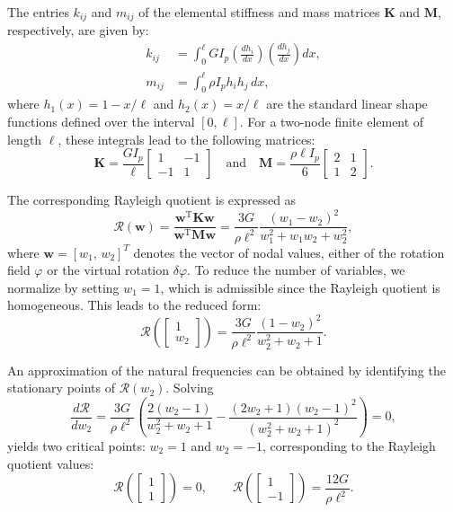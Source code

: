 \documentclass[12pt]{article}
\begin{document}
The entries \( k_{ij} \) and \( m_{ij} \) of the elemental stiffness and mass matrices \( \mathbf{K} \) and \( \mathbf{M} \), respectively, are given by:
\begin{align*}
    k_{ij} & = \int_0^{\ell} G I_p \left( \frac{d h_i}{dx} \right) \left( \frac{d h_j}{dx} \right) dx, \\
    m_{ij} & = \int_0^{\ell} \rho I_p h_i h_j \, dx,
\end{align*}
where \(  h_1(x)=1-x/\ell \) and \(  h_2(x)=x/\ell\) are the standard linear shape functions defined over the interval \([0, \ell]\). For a two-node finite element of length \( \ell \), these integrals lead to the following matrices:
\[
    \mathbf{K} = \frac{G I_p}{\ell}
    \begin{bmatrix}
        1  & -1 \\
        -1 & 1
    \end{bmatrix} \quad\text{and}\quad
    \mathbf{M} = \frac{\rho\ell I_p}{6}
    \begin{bmatrix}
        2 & 1 \\
        1 & 2
    \end{bmatrix}.
\]

The corresponding Rayleigh quotient is expressed as
\[
    \mathcal{R}(\mathbf{w}) = \frac{\mathbf{w}^\mathrm{T} \mathbf{K} \mathbf{w}}{\mathbf{w}^\mathrm{T} \mathbf{M} \mathbf{w}} = \frac{3G}{\rho\ell^2} \frac{(w_1 - w_2)^2}{w_1^2 + w_1 w_2 + w_2^2},
\]
where \( \mathbf{w} = [w_1,\, w_2]^T \) denotes the vector of nodal values, either of the rotation field \( \varphi \) or the virtual rotation \( \delta\varphi \). To reduce the number of variables, we normalize by setting \( w_1 = 1 \), which is admissible since the Rayleigh quotient is homogeneous. This leads to the reduced form:
\[
    \mathcal{R}\left( \begin{bmatrix} 1 \\ w_2 \end{bmatrix} \right) = \frac{3G}{\rho\ell^2} \frac{(1 - w_2)^2}{w_2^2 + w_2 + 1}.
\]

An approximation of the natural frequencies can be obtained by identifying the stationary points of \( \mathcal{R}(w_2) \). Solving
\[
    \frac{d \mathcal{R}}{dw_2} = \frac{3G}{\rho\ell^2} \left( \frac{2(w_2 - 1)}{w_2^2 + w_2 + 1} - \frac{(2w_2 + 1)(w_2 - 1)^2}{(w_2^2 + w_2 + 1)^2} \right) = 0,
\]
yields two critical points: \( w_2 = 1 \) and \( w_2 = -1 \), corresponding to the Rayleigh quotient values:
\[
    \mathcal{R}\left( \begin{bmatrix} 1 \\ 1 \end{bmatrix} \right) = 0, \qquad \mathcal{R}\left( \begin{bmatrix} 1 \\ -1 \end{bmatrix} \right) = \frac{12G}{\rho\ell^2}.
\]
\end{document}
